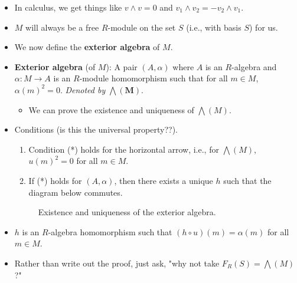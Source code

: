 \documentclass[../notes.tex]{subfiles}
\begin{document}
\begin{itemize}
    \item In calculus, we get things like $v\wedge v=0$ and $v_1\wedge v_2=-v_2\wedge v_1$.
    \item $M$ will always be a free $R$-module on the set $S$ (i.e., with basis $S$) for us.
    \item We now define the \textbf{exterior algebra} of $M$.
    \item \textbf{Exterior algebra} (of $M$): A pair $(A,\alpha)$ where $A$ is an $R$-algebra and $\alpha:M\to A$ is an $R$-module homomorphism such that for all $m\in M$, $\alpha(m)^2=0$. \emph{Denoted by} $\bm{\bigwedge(M)}$.
    \begin{itemize}
        \item We can prove the existence and uniqueness of $\bigwedge(M)$.
    \end{itemize}
    \item Conditions (is this the universal property??).
    \begin{enumerate}
        \item Condition (*) holds for the horizontal arrow, i.e., for $\bigwedge(M)$, $u(m)^2=0$ for all $m\in M$.
        \item If (*) holds for $(A,\alpha)$, then there exists a unique $h$ such that the diagram below commutes.
    \end{enumerate}
    \begin{figure}[H]
        \centering
        \caption{Existence and uniqueness of the exterior algebra.}
        \label{fig:existUniqueExAlg}
    \end{figure}
    \item $h$ is an $R$-algebra homomorphism such that $(h\circ u)(m)=\alpha(m)$ for all $m\in M$.
    \item Rather than write out the proof, just ask, "why not take $F_R(S)=\bigwedge(M)$?"
    \begin{figure}[H]
        \centering
\end{figure}
\end{itemize}
\end{document}
